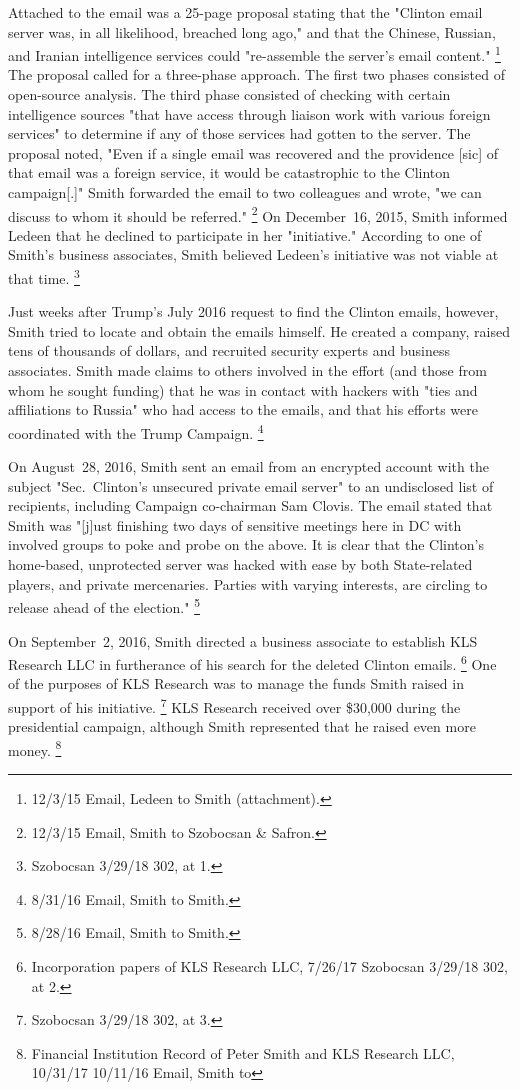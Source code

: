 Attached to the email was a 25-page proposal stating that the "Clinton email server was, in all likelihood, breached long ago," and that the Chinese, Russian, and Iranian intelligence services could "re-assemble the server's email content."%
\footnote{12/3/15 Email, Ledeen to Smith (attachment).}
The proposal called for a three-phase approach.
The first two phases consisted of open-source analysis.
The third phase consisted of checking with certain intelligence sources "that have access through liaison work with various foreign services" to determine if any of those services had gotten to the server.
The proposal noted, "Even if a single email was recovered and the providence [sic] of that email was a foreign service, it would be catastrophic to the Clinton campaign[.]"
Smith forwarded the email to two colleagues and wrote, "we can discuss to whom it should be referred."%
\footnote{12/3/15 Email, Smith to Szobocsan \& Safron.}
On December~16, 2015, Smith informed Ledeen that he declined to participate in her "initiative."
According to one of Smith's business associates, Smith believed Ledeen's initiative was not viable at that time.%
\footnote{Szobocsan 3/29/18 302, at 1.}

Just weeks after Trump's July 2016 request to find the Clinton emails, however, Smith tried to locate and obtain the emails himself.
He created a company, raised tens of thousands of dollars, and recruited security experts and business associates.
Smith made claims to others involved in the effort (and those from whom he sought funding) that he was in contact with hackers with "ties and affiliations to Russia" who had access to the emails, and that his efforts were coordinated with the Trump Campaign.%
\footnote{8/31/16 Email, Smith to Smith.}

On August~28, 2016, Smith sent an email from an encrypted account with the subject "Sec.~Clinton's unsecured private email server" to an undisclosed list of recipients, including Campaign co-chairman Sam Clovis.
The email stated that Smith was "[j]ust finishing two days of sensitive meetings here in DC with involved groups to poke and probe on the above.
It is clear that the Clinton's home-based, unprotected server was hacked with ease by both State-related players, and private mercenaries.
Parties with varying interests, are circling to release ahead of the election."%
\footnote{8/28/16 Email, Smith to Smith.}

On September~2, 2016, Smith directed a business associate to establish KLS Research LLC in furtherance of his search for the deleted Clinton emails.%
\footnote{Incorporation papers of KLS Research LLC, 7/26/17 
Szobocsan 3/29/18 302, at 2.}
One of the purposes of KLS Research was to manage the funds Smith raised in support of his initiative.%
\footnote{Szobocsan 3/29/18 302, at 3.}
KLS Research received over \$30,000 during the presidential campaign, although Smith represented that he raised even more money.%
\footnote{Financial Institution Record of Peter Smith and KLS Research LLC, 10/31/17  10/11/16 Email, Smith to }

